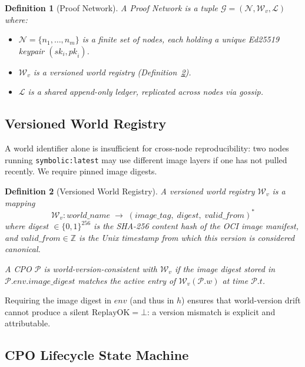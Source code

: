 \documentclass[11pt]{article}
\newtheorem{definition}{Definition}
\begin{document}
\begin{definition}[Proof Network]
A \emph{Proof Network} is a tuple $\mathcal{G} = (\mathcal{N}, \mathcal{W}_v, \mathcal{L})$
where:
\begin{itemize}
  \item $\mathcal{N} = \{n_1, \ldots, n_m\}$ is a finite set of nodes, each
        holding a unique Ed25519 keypair $(\mathit{sk}_i, \mathit{pk}_i)$.
  \item $\mathcal{W}_v$ is a \emph{versioned world registry}
        (Definition~\ref{def:worldreg}).
  \item $\mathcal{L}$ is a shared append-only ledger, replicated across
        nodes via gossip.
\end{itemize}
\end{definition}

\subsection{Versioned World Registry}
\label{sec:worldver}

A world identifier alone is insufficient for cross-node reproducibility:
two nodes running \texttt{symbolic:latest} may use different image layers
if one has not pulled recently.  We require pinned image digests.

\begin{definition}[Versioned World Registry]
\label{def:worldreg}
A \emph{versioned world registry} $\mathcal{W}_v$ is a mapping
\[
  \mathcal{W}_v : \textit{world\_name} \;\longrightarrow\;
    (\textit{image\_tag},\; \textit{digest},\; \textit{valid\_from})^*
\]
where \textit{digest} $\in \{0,1\}^{256}$ is the SHA-256 content hash of
the OCI image manifest, and $\textit{valid\_from} \in \mathbb{Z}$ is the
Unix timestamp from which this version is considered canonical.

A CPO $\mathcal{P}$ is \emph{world-version-consistent} with $\mathcal{W}_v$
if the image digest stored in $\mathcal{P}.\textit{env}.\textit{image\_digest}$
matches the active entry of $\mathcal{W}_v(\mathcal{P}.w)$ at time
$\mathcal{P}.t$.
\end{definition}

Requiring the image digest in $\textit{env}$ (and thus in $h$) ensures that
world-version drift cannot produce a silent $\mathrm{ReplayOK} = \bot$:
a version mismatch is explicit and attributable.

\subsection{CPO Lifecycle State Machine}
\label{sec:statemachine}
\end{document}
